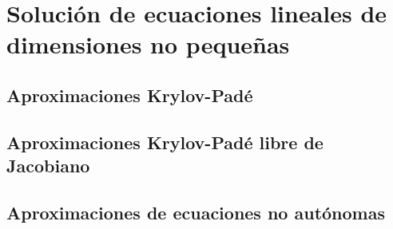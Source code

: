 \chapter{Solución de ecuaciones lineales de dimensiones no pequeñas}\label{chapter:solve-non-smal-lineal-eq}

\section{Aproximaciones Krylov-Padé}


\section{Aproximaciones Krylov-Padé libre de Jacobiano}


\section{Aproximaciones de ecuaciones no autónomas}
